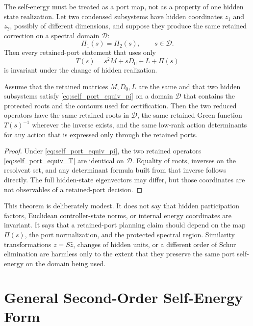 The self-energy must be treated as a port map, not as a property of one hidden
state realization. Let two condensed subsystems have hidden coordinates
\(z_1\) and \(z_2\), possibly of different dimensions, and suppose they produce
the same retained correction on a spectral domain \(\mathcal D\):
\begin{equation}
  \Pi_1(s)=\Pi_2(s),\qquad s\in\mathcal D .
  \label{eq:self_port_equiv_pi}
\end{equation}
Then every retained-port statement that uses only
\begin{equation}
  T(s)=s^2M+sD_0+L+\Pi(s)
  \label{eq:self_port_equiv_T}
\end{equation}
is invariant under the change of hidden realization.

\begin{theorem}
\label{thm:self_port_sufficiency}
Assume that the retained matrices \(M,D_0,L\) are the same and that two hidden
subsystems satisfy \eqref{eq:self_port_equiv_pi} on a domain \(\mathcal D\)
that contains the protected roots and the contours used for certification.
Then the two reduced operators have the same retained roots in
\(\mathcal D\), the same retained Green function \(T(s)^{-1}\) wherever the
inverse exists, and the same low-rank action determinants for any action that
is expressed only through the retained ports.
\end{theorem}

\begin{proof}
Under \eqref{eq:self_port_equiv_pi}, the two retained operators
\eqref{eq:self_port_equiv_T} are identical on \(\mathcal D\). Equality of
roots, inverses on the resolvent set, and any determinant formula built from
that inverse follows directly. The full hidden-state eigenvectors may differ,
but those coordinates are not observables of a retained-port decision.
\end{proof}

This theorem is deliberately modest. It does not say that hidden
participation factors, Euclidean controller-state norms, or internal energy
coordinates are invariant. It says that a retained-port planning claim should
depend on the map \(\Pi(s)\), the port normalization, and the protected
spectral region. Similarity transformations \(z=S\widehat z\), changes of
hidden units, or a different order of Schur elimination are harmless only to
the extent that they preserve the same port self-energy on the domain being
used.

\section{General Second-Order Self-Energy Form}

